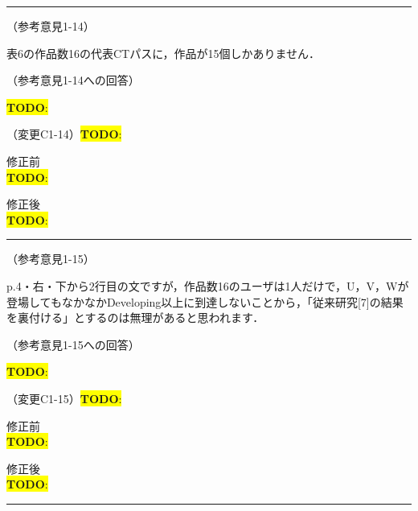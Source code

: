 \documentclass{jarticle} %
\newcommand{\todo}[1]{\colorbox{yellow}{{\bf TODO}:}{\color{blue}{\textbf{[#1]}}}}
\def\subsection#1{ \vspace{1pc} {\gt #1} }
\def\nextans{ \vspace{2pc} \hrule }
\begin{document}
\newpage
\nextans
\subsection{（参考意見1-14）}

表6の作品数16の代表CTパスに，作品が15個しかありません．

\subsection{（参考意見1-14への回答）}

\todo{hoge}

\subsection{（変更C1-14）\todo{hoge}}
\vspace{-0.3cm}
\begin{description}
\item 修正前\\
\phantom{　}
\todo{hoge}
\vspace{-0.3cm}
\item 修正後\\
\phantom{　}
\todo{hoge}
\end{description}


\newpage
\nextans
\subsection{（参考意見1-15）}

p.4・右・下から2行目の文ですが，作品数16のユーザは1人だけで，U，V，Wが登場してもなかなかDeveloping以上に到達しないことから，「従来研究[7]の結果を裏付ける」とするのは無理があると思われます．

\subsection{（参考意見1-15への回答）}

\todo{hoge}

\subsection{（変更C1-15）\todo{hoge}}
\vspace{-0.3cm}
\begin{description}
\item 修正前\\
\phantom{　}
\todo{hoge}
\vspace{-0.3cm}
\item 修正後\\
\phantom{　}
\todo{hoge}
\end{description}
\newpage
\nextans
\end{document}
